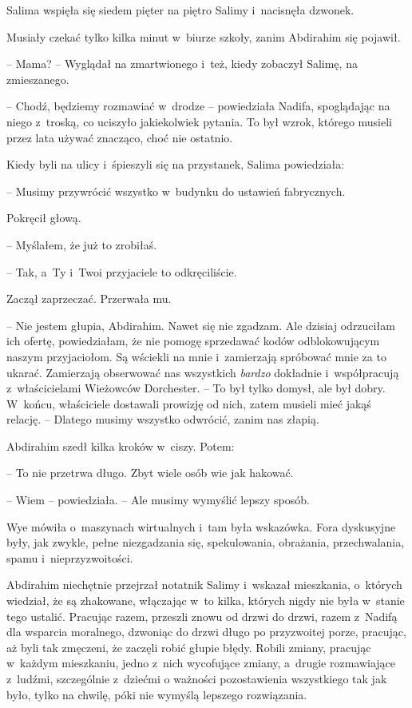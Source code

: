 \documentclass[oneside,polish,11pt,sfheadings]{mwbk}
\begin{document}
Salima wspięła się siedem pięter na piętro Salimy i~nacisnęła dzwonek.

Musiały czekać tylko kilka minut w~biurze szkoły, zanim Abdirahim się
pojawił. 

-- Mama? -- Wyglądał na zmartwionego i~też, kiedy zobaczył
Salimę, na zmieszanego.

-- Chodź, będziemy rozmawiać w~drodze -- powiedziała Nadifa, spoglądając
na niego z~troską, co uciszyło jakiekolwiek pytania. To był wzrok,
którego musieli przez lata używać znacząco, choć nie ostatnio.

Kiedy byli na ulicy i~śpieszyli się na przystanek, Salima powiedziała: 

-- Musimy przywrócić wszystko w~budynku do ustawień fabrycznych.

Pokręcił głową. 

-- Myślałem, że już to zrobiłaś.

-- Tak, a~Ty i~Twoi przyjaciele to odkręciliście.

Zaczął zaprzeczać. Przerwała mu.

-- Nie jestem głupia, Abdirahim. Nawet się nie zgadzam. Ale dzisiaj
odrzuciłam ich ofertę, powiedziałam, że nie pomogę sprzedawać kodów
odblokowującym naszym przyjaciołom. Są wściekli na mnie i~zamierzają
spróbować mnie za to ukarać. Zamierzają obserwować nas wszystkich
\textit{bardzo} dokładnie i~współpracują z~właścicielami Wieżowców
Dorchester. -- To był tylko domysł, ale był dobry. W~końcu, właściciele
dostawali prowizję od nich, zatem musieli mieć jakąś relację. -- Dlatego
musimy wszystko odwrócić, zanim nas złapią.

Abdirahim szedł kilka kroków w~ciszy. Potem: 

-- To nie przetrwa długo.
Zbyt wiele osób wie jak hakować.

-- Wiem -- powiedziała. -- Ale musimy wymyślić lepszy sposób.

Wye mówiła o~maszynach wirtualnych i~tam była wskazówka. Fora dyskusyjne
były, jak zwykle, pełne niezgadzania się, spekulowania, obrażania,
przechwalania, spamu i~nieprzyzwoitości.

Abdirahim niechętnie przejrzał notatnik Salimy i~wskazał mieszkania, o~których wiedział, że są zhakowane, włączając w~to kilka, których nigdy
nie była w~stanie tego ustalić. Pracując razem, przeszli znowu od drzwi
do drzwi, razem z~Nadifą dla wsparcia moralnego, dzwoniąc do drzwi długo
po przyzwoitej porze, pracując, aż byli tak zmęczeni, że zaczęli robić
głupie błędy. Robili zmiany, pracując w~każdym mieszkaniu, jedno z~nich
wycofujące zmiany, a~drugie rozmawiające z~ludźmi, szczególnie z~dziećmi
o ważności pozostawienia wszystkiego tak jak było, tylko na chwilę, póki
nie wymyślą lepszego rozwiązania.
\end{document}

